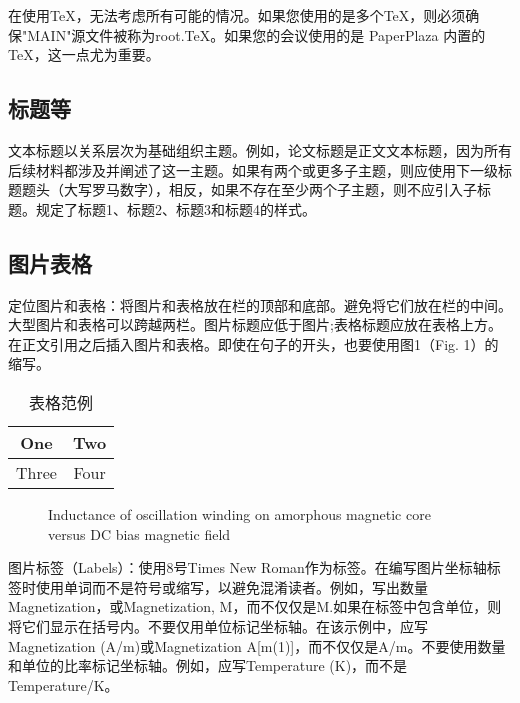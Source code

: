 \documentclass[letterpaper, 10 pt, conference]{ieeeconf}  %
\begin{document}
在使用\TeX，无法考虑所有可能的情况。如果您使用的是多个\TeX{}，则必须确保"MAIN"源文件被称为root.TeX。如果您的会议使用的是 PaperPlaza 内置的\TeX{}，这一点尤为重要。

\subsection{标题等}

文本标题以关系层次为基础组织主题。例如，论文标题是正文文本标题，因为所有后续材料都涉及并阐述了这一主题。如果有两个或更多子主题，则应使用下一级标题题头（大写罗马数字），相反，如果不存在至少两个子主题，则不应引入子标题。规定了标题1、标题2、标题3和标题4的样式。

\subsection{图片表格}

定位图片和表格：将图片和表格放在栏的顶部和底部。避免将它们放在栏的中间。大型图片和表格可以跨越两栏。图片标题应低于图片;表格标题应放在表格上方。在正文引用之后插入图片和表格。即使在句子的开头，也要使用图1（Fig. 1）的缩写。

\begin{table}[h]
\caption{表格范例}
\label{table_example}
\begin{center}
\begin{tabular}{|c||c|}
\hline
One & Two\\
\hline
Three & Four\\
\hline
\end{tabular}
\end{center}
\end{table}


   \begin{figure}[thpb]
      \centering
      \caption{Inductance of oscillation winding on amorphous
       magnetic core versus DC bias magnetic field}
      \label{figurelabel}
   \end{figure}
   

图片标签（Labels）：使用8号Times New Roman作为标签。在编写图片坐标轴标签时使用单词而不是符号或缩写，以避免混淆读者。例如，写出数量Magnetization，或Magnetization, M，而不仅仅是M.如果在标签中包含单位，则将它们显示在括号内。不要仅用单位标记坐标轴。在该示例中，应写Magnetization (A/m)或Magnetization {A[m(1)]}，而不仅仅是A/m。不要使用数量和单位的比率标记坐标轴。例如，应写Temperature (K)，而不是Temperature/K。
\end{document}
